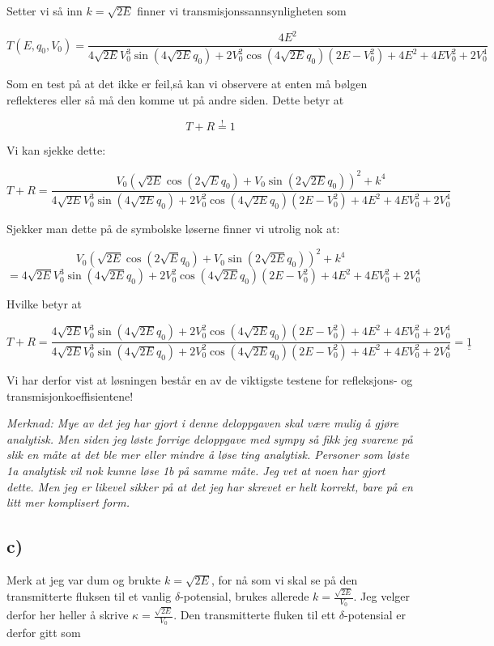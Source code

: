 \documentclass[a4paper,norsk, 10pt]{article}
\numberwithin{equation}{section}
\begin{document}
Setter vi så inn $k = \sqrt{2E}$ finner vi transmisjonssannsynligheten som

\begin{equation}
T(E,q_0,V_0) = \frac{4E^2}{4\sqrt{2E}V_0^3\sin(4\sqrt{2E} q_0) + 2V_0^2\cos(4\sqrt{2E} q_0)(2E - V_0^2)+4E^2 +4EV_0^2 + 2V_0^4}
\end{equation} 

Som en test på at det ikke er feil,så kan vi observere at enten må bølgen reflekteres eller så må den komme ut på andre siden. Dette betyr at 

$$
T + R \overset{!}{=} 1
$$


Vi kan sjekke dette:

$$
T + R = \frac{V_0\left(\sqrt{2E}\cos(2\sqrt{E}q_0) + V_0\sin(2\sqrt{2E} q_0)\right)^2 + k^4}{4\sqrt{2E}V_0^3\sin(4\sqrt{2E} q_0) + 2V_0^2\cos(4\sqrt{2E} q_0)(2E - V_0^2)+4E^2 +4EV_0^2 + 2V_0^4}
$$

Sjekker man dette på de symbolske løserne finner vi utrolig nok at:

$$
V_0\left(\sqrt{2E}\cos(2\sqrt{E}q_0) + V_0\sin(2\sqrt{2E} q_0)\right)^2 + k^4
$$
$$
= 4\sqrt{2E}V_0^3\sin(4\sqrt{2E} q_0) + 2V_0^2\cos(4\sqrt{2E} q_0)(2E - V_0^2)+4E^2 +4EV_0^2 + 2V_0^4
$$

Hvilke betyr at

$$
T + R = \frac{4\sqrt{2E}V_0^3\sin(4\sqrt{2E} q_0) + 2V_0^2\cos(4\sqrt{2E} q_0)(2E - V_0^2)+4E^2 +4EV_0^2 + 2V_0^4}{4\sqrt{2E}V_0^3\sin(4\sqrt{2E} q_0) + 2V_0^2\cos(4\sqrt{2E} q_0)(2E - V_0^2)+4E^2 +4EV_0^2 + 2V_0^4} = \underline{\underline{1}}
$$

Vi har derfor vist at løsningen består en av de viktigste testene for refleksjons- og transmisjonkoeffisientene!

\textit{Merknad: Mye av det jeg har gjort i denne deloppgaven skal være mulig å gjøre analytisk. Men siden jeg løste forrige deloppgave med sympy så fikk jeg svarene på slik en måte at det ble mer eller mindre å løse ting analytisk. Personer som løste 1a analytisk vil nok kunne løse 1b på samme måte. Jeg vet at noen har gjort dette. Men jeg er likevel sikker på at det jeg har skrevet er helt korrekt, bare på en litt mer komplisert form.}

\newpage
\subsection*{c)}

Merk at jeg var dum og brukte $k = \sqrt{2E}$, for nå som vi skal se på den transmitterte fluksen til et vanlig $\delta$-potensial, brukes allerede $k = \frac{\sqrt{2E}}{V_0}$. Jeg velger derfor her heller å skrive $\kappa = \frac{\sqrt{2E}}{V_0}$. Den transmitterte fluken til ett $\delta$-potensial er derfor gitt som
\end{document}
